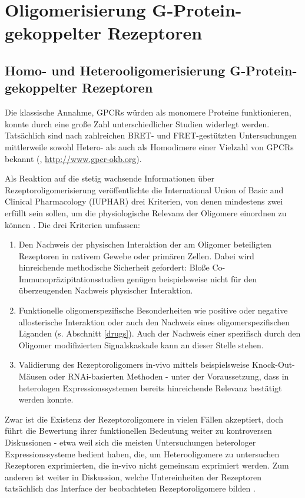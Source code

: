 \section{Oligomerisierung G-Protein-gekoppelter Rezeptoren}
\subsection{Homo- und Heterooligomerisierung G-Protein-gekoppelter Rezeptoren}
Die klassische Annahme, GPCRs würden als monomere Proteine funktionieren, konnte durch eine große Zahl unterschiedlicher Studien widerlegt werden. Tatsächlich sind nach zahlreichen BRET- und FRET-gestützten Untersuchungen mittlerweile sowohl Hetero- als auch als Homodimere einer Vielzahl von GPCRs bekannt (\cite{Khelashvili2010}, \url{http://www.gpcr-okb.org}).

Als Reaktion auf die stetig wachsende Informationen über Rezeptoroligomerisierung veröffentlichte die International Union of Basic and Clinical Pharmacology (IUPHAR) drei Kriterien, von denen mindestens zwei erfüllt sein sollen, um die physiologische Relevanz der Oligomere einordnen zu können \parencite{Pin2007}. Die drei Kriterien umfassen:
\begin{enumerate}
\item Den Nachweis der physischen Interaktion der am Oligomer beteiligten Rezeptoren in nativem Gewebe oder primären Zellen. Dabei wird hinreichende methodische Sicherheit gefordert: Bloße Co-Immunopräzipitationsstudien genügen beispielsweise nicht für den überzeugenden Nachweis physischer Interaktion.
\item Funktionelle oligomerspezifische Besonderheiten wie positive oder negative allosterische Interaktion oder auch den Nachweis eines oligomerspezifischen Liganden (s. Abschnitt \ref{drugs}). Auch der Nachweis einer spezifisch durch den Oligomer modifizierten Signalskaskade kann an dieser Stelle stehen.
\item Validierung des Rezeptoroligomers in-vivo mittels beispielsweise Knock-Out-Mäusen oder RNAi-basierten Methoden - unter der Voraussetzung, dass in heterologen Expressionssystemen bereits hinreichende Relevanz bestätigt werden konnte. 

\end{enumerate}

Zwar ist die Existenz der Rezeptoroligomere in vielen Fällen akzeptiert, doch führt die Bewertung ihrer funktionellen Bedeutung weiter zu kontroversen Diskussionen - etwa weil sich die meisten Untersuchungen heterologer Expressionssysteme bedient haben, die, um Heterooligomere zu untersuchen Rezeptoren exprimierten, die in-vivo nicht gemeinsam exprimiert werden. Zum anderen ist weiter in Diskussion, welche Untereinheiten der Rezeptoren tatsächlich das Interface der beobachteten Rezeptoroligomere bilden \parencite{Terrillon2004}. 

